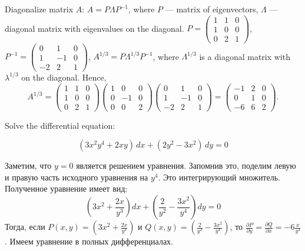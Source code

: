 \documentclass[addpoints, answers]{exam} %
\begin{document}
\begin{questions}
\begin{parts}
\begin{solution}
Diagonalize matrix $A$: $A = P \Lambda P^{-1}$, where $P$ — matrix of eigenvectors, $\Lambda$ — diagonal matrix with eigenvalues on the diagonal.
$P = \begin{pmatrix}
1 & 1 & 0\\
1 & 0 & 0\\
0 & 2 & 1
\end{pmatrix}
$,
$P^{-1} = \begin{pmatrix}
0 & 1 & 0\\
1 & -1 & 0\\
-2 & 2 & 1
\end{pmatrix}
$,
$A^{1/3} = P \Lambda^{1/3} P^{-1}$, where $\Lambda^{1/3}$ is a diagonal matrix with $\lambda^{1/3}$ on the diagonal. Hence,
\[
A^{1/3} = \begin{pmatrix}
1 & 1 & 0\\
1 & 0 & 0\\
0 & 2 & 1
\end{pmatrix}
\begin{pmatrix}
1 & 0 & 0\\
0 & -1 & 0\\
0 & 0 & 2
\end{pmatrix}
\begin{pmatrix}
0 & 1 & 0\\
1 & -1 & 0\\
-2 & 2 & 1
\end{pmatrix} =
\begin{pmatrix}
-1 & 2 & 0\\
0 & 1 & 0\\
-6 & 6 & 2
\end{pmatrix}.
\]


\end{solution}

\end{parts}




\question[10] Solve the  differential equation:

\[
(3x^2y^4+2xy) \, dx + (2y^2-3x^2) \, dy = 0
\]


\begin{solution}
Заметим, что $y=0$ является решением уравнения. Запомнив это, поделим левую и правую часть исходного уравнения на $y^4$. Это интегрирующий множитель. Полученное уравнение имеет вид:
\[\left(3x^2+\frac{2x}{y^3}\right)dx+\left(\frac{2}{y^2}-\frac{3x^2}{y^4}\right)dy=0\]
Тогда, если $P\left(x,y\right)=\left(3x^2+\frac{2x}{y^3}\right)$ и $Q\left(x,y\right)=\left(\frac{2}{y^2}-\frac{3x^2}{y^4}\right)$, то $\frac{\partial P}{\partial y}=\frac{\partial Q}{\partial x}=-6\frac{x}{y^4}$. Имеем уравнение в полных дифференциалах.


\end{solution}
\end{questions}
\end{document}
